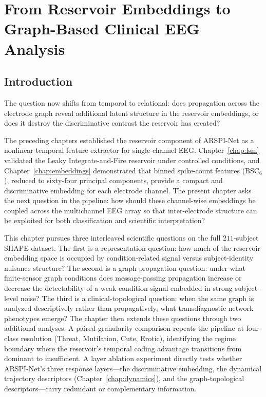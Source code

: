 \chapter{From Reservoir Embeddings to Graph-Based Clinical EEG Analysis}
\label{chap:arspi_net}

\section{Introduction}
\label{sec:ch5_intro}

The question now shifts from temporal to relational: does propagation across the electrode graph reveal additional latent structure in the reservoir embeddings, or does it destroy the discriminative contrast the reservoir has created?

The preceding chapters established the reservoir component of ARSPI-Net as a nonlinear temporal feature extractor for single-channel EEG. Chapter~\ref{chap:lsm} validated the Leaky Integrate-and-Fire reservoir under controlled conditions, and Chapter~\ref{chap:embeddings} demonstrated that binned spike-count features (BSC$_6$), reduced to sixty-four principal components, provide a compact and discriminative embedding for each electrode channel. The present chapter asks the next question in the pipeline: how should these channel-wise embeddings be coupled across the multichannel EEG array so that inter-electrode structure can be exploited for both classification and scientific interpretation?

This chapter pursues three interleaved scientific questions on the full $211$-subject SHAPE dataset. The first is a representation question: how much of the reservoir embedding space is occupied by condition-related signal versus subject-identity nuisance structure? The second is a graph-propagation question: under what finite-sensor graph conditions does message-passing propagation increase or decrease the detectability of a weak condition signal embedded in strong subject-level noise? The third is a clinical-topological question: when the same graph is analyzed descriptively rather than propagatively, what transdiagnostic network phenotypes emerge? The chapter then extends these questions through two additional analyses. A paired-granularity comparison repeats the pipeline at four-class resolution (Threat, Mutilation, Cute, Erotic), identifying the regime boundary where the reservoir's temporal coding advantage transitions from dominant to insufficient. A layer ablation experiment directly tests whether ARSPI-Net's three response layers---the discriminative embedding, the dynamical trajectory descriptors (Chapter~\ref{chap:dynamics}), and the graph-topological descriptors---carry redundant or complementary information.

